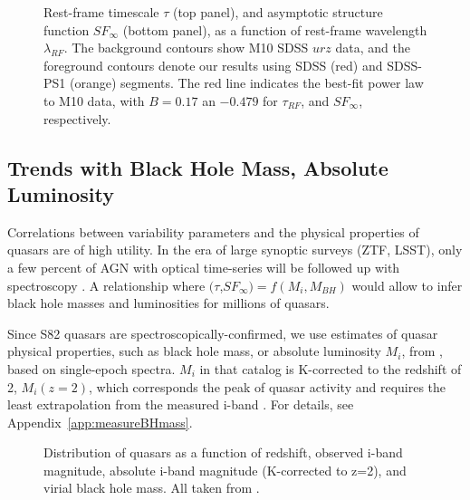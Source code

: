 \documentclass[twocolumn]{aastex62}
\begin{document}
  
\begin{figure} %
\caption{Rest-frame timescale $\tau$ (top panel), and asymptotic structure function $SF_{\infty}$ (bottom panel), as a function of rest-frame wavelength $\lambda_{RF}$. The background contours show M10 SDSS $ urz $  data, and the foreground contours  denote our results using  SDSS (red) and SDSS-PS1 (orange) segments. The red line indicates the best-fit power law to M10 data, with $B=0.17$ an $-0.479$ for $\tau_{RF}$, and $SF_{\infty}$, respectively.}
\label{fig:lambda_dependence}
\end{figure} 




\subsection{Trends with Black Hole Mass, Absolute Luminosity}

Correlations between variability parameters and the physical properties of quasars are of high utility. In the era of large synoptic surveys (ZTF, LSST), only a few percent of AGN with optical time-series will be followed up with spectroscopy \citep{ivezic2019}. A relationship where $(\tau$,$SF_{\infty}) = f(M_{i}, M_{BH})$ would allow to infer black hole masses  and luminosities for millions of quasars.

Since S82 quasars are spectroscopically-confirmed, we use estimates of quasar physical properties, such as black hole mass, or absolute luminosity $M_{i}$, from \cite{shen2011}, based on single-epoch spectra.  $M_{i}$ in that catalog is K-corrected to the redshift of 2, $M_{i}(z=2)$, which corresponds the peak of quasar activity and requires the least extrapolation from the measured i-band \citep{richards2006a}. For details, see Appendix~\ref{app:measureBHmass}.

\begin{figure*} %
\caption{Distribution of quasars as a function of  redshift, observed i-band magnitude, absolute i-band magnitude (K-corrected to z=2), and virial black hole mass. All taken from \citep{shen2011}. }
\label{fig:quasar_properties}
\end{figure*} 
\end{document}
